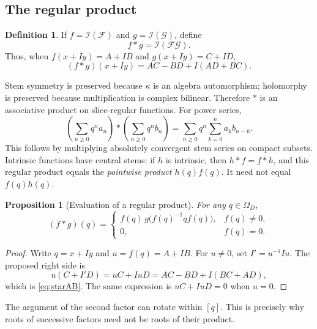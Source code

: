 \documentclass[11pt,a4paper]{article}
\numberwithin{equation}{section}
\newtheorem{proposition}[theorem]{Proposition}
\theoremstyle{definition}
\newtheorem{definition}[theorem]{Definition}
\theoremstyle{remark}
\newcommand{\cI}{\mathcal I}
\begin{document}
\subsection{The regular product}
\begin{definition}
If $f=\cI(\mathcal F)$ and $g=\cI(\mathcal G)$, define
\[
 f*g=\cI(\mathcal F\mathcal G).
\]
Thus, when $f(x+Iy)=A+IB$ and $g(x+Iy)=C+ID$,
\begin{equation}
 (f*g)(x+Iy)=AC-BD+I(AD+BC).
 \label{eq:starAB}
\end{equation}
\end{definition}
Stem symmetry is preserved because $\kappa$ is an algebra automorphism;
holomorphy is preserved because multiplication is complex bilinear. Therefore
$*$ is an associative product on slice-regular functions. For power series,
\begin{equation}
 \left(\sum_{n\ge0}q^n a_n\right)*
 \left(\sum_{n\ge0}q^n b_n\right)
 =\sum_{n\ge0}q^n\sum_{k=0}^n a_k b_{n-k}.
 \label{eq:convolution}
\end{equation}
This follows by multiplying absolutely convergent stem series on compact
subsets. Intrinsic functions have central stems: if $h$ is intrinsic, then
$h*f=f*h$, and this regular product equals the \emph{pointwise product
$h(q)f(q)$}. It need not equal $f(q)h(q)$.

\begin{proposition}[Evaluation of a regular product]
\label{prop:evaluation}
For any $q\in\Omega_D$,
\begin{equation}
 (f*g)(q)=
 \begin{cases}
 f(q)\,g\bigl(f(q)^{-1}qf(q)\bigr),&f(q)\ne0,\\
 0,&f(q)=0.
 \end{cases}
 \label{eq:evaluation}
\end{equation}
\end{proposition}
\begin{proof}
Write $q=x+Iy$ and $u=f(q)=A+IB$. For $u\ne0$, set $I'=u^{-1}Iu$.
The proposed right side is
\[
 u(C+I'D)=uC+IuD=AC-BD+I(BC+AD),
\]
which is \eqref{eq:starAB}. The same expression is $uC+IuD=0$ when $u=0$.
\end{proof}
The argument of the second factor can rotate within $[q]$. This is precisely
why roots of successive factors need not be roots of their product.
\end{document}
